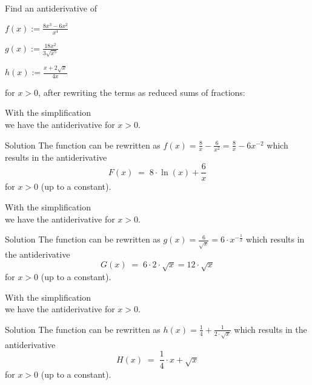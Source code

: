 \begin{MExercises}
\begin{MExercise}
Find an antiderivative of 
\begin{MExerciseItems}
\item $\displaystyle f(x) := \frac{8 x^3 - 6 x^2}{x^4}$
\item $\displaystyle g(x) := \frac{18 x^2}{3 \sqrt{x^5}}$
\item $\displaystyle h(x) := \frac{x + 2 \sqrt{x}}{4x}$
\end{MExerciseItems}
for $x > 0$, after rewriting the terms as reduced sums of fractions:

\begin{MExerciseItems}
\item{With the simplification \\ 
we have the antiderivative  for $x>0$.\\
\begin{MHint}{Solution}
The function can be rewritten as %
$f(x) = \frac{8}{x} - \frac{6}{x^2} = \frac{8}{x} - 6 x^{-2}$
which results in the antiderivative 
\[
F(x) \;=\; 8 \cdot \ln(x) + \frac{6}{x} %
\]
for $x > 0$ (up to a constant).
\end{MHint}
}
\item{With the simplification  \\
we have the antiderivative  for $x > 0$.\\
\begin{MHint}{Solution}
The function can be rewritten as  %
$g(x) = \frac{6}{\sqrt{x}} = 6 \cdot x^{-\frac{1}{2}}$ %
which results in the antiderivative
\[
G(x) \;=\; 6 \cdot 2 \cdot \sqrt{x} = 12 \cdot \sqrt{x} %
\]
for $x > 0$ (up to a constant).
\end{MHint}
}
\item{With the simplification \\
we have the antiderivative  for $x > 0$.\\
\begin{MHint}{Solution}
The function can be rewritten as %
$h(x)=\frac{1}{4} + \frac{1}{2 \cdot \sqrt{x}}$ 
which results in the antiderivative 
\[
H(x) \;=\; \frac{1}{4} \cdot x + \sqrt{x} %
\]
for $x > 0$ (up to a constant).
\end{MHint}
}
\end{MExerciseItems}
\end{MExercise}



\end{MExercises}
